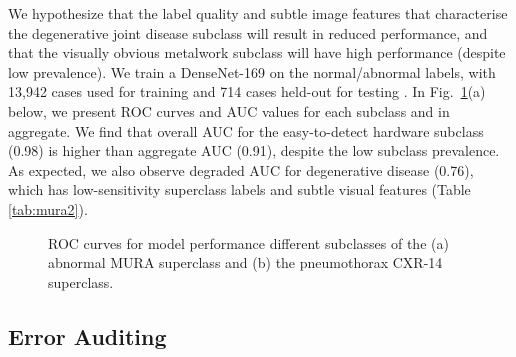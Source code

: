 \documentclass{article}
\begin{document}
We hypothesize that the label quality and subtle image features that characterise the degenerative joint disease subclass will result in reduced performance, and that the visually obvious metalwork subclass will have high performance (despite low prevalence).
 We train a DenseNet-169 on the normal/abnormal labels, with 13,942 cases used for training and 714 cases held-out for testing \citep{Rajpurkar2017-rc}.  
 In Fig.~\ref{fig:rocs}(a) below, we present ROC curves and AUC values for each subclass and in aggregate.  
 We find that overall AUC for the easy-to-detect hardware subclass (0.98) is higher than aggregate AUC (0.91), despite the low  subclass prevalence.
 As expected, we also observe degraded AUC for degenerative disease (0.76), which has low-sensitivity superclass labels and subtle visual features (Table \ref{tab:mura2}).  

 \begin{figure}[htb!]%
 \vspace{-5mm}
\centering
{}%
\caption{ROC curves for model performance different subclasses of the (a) abnormal MURA superclass and (b) the pneumothorax CXR-14 superclass.}
\label{fig:rocs}
\vspace{-4 mm}
\end{figure}


\subsection{Error Auditing}
\end{document}
